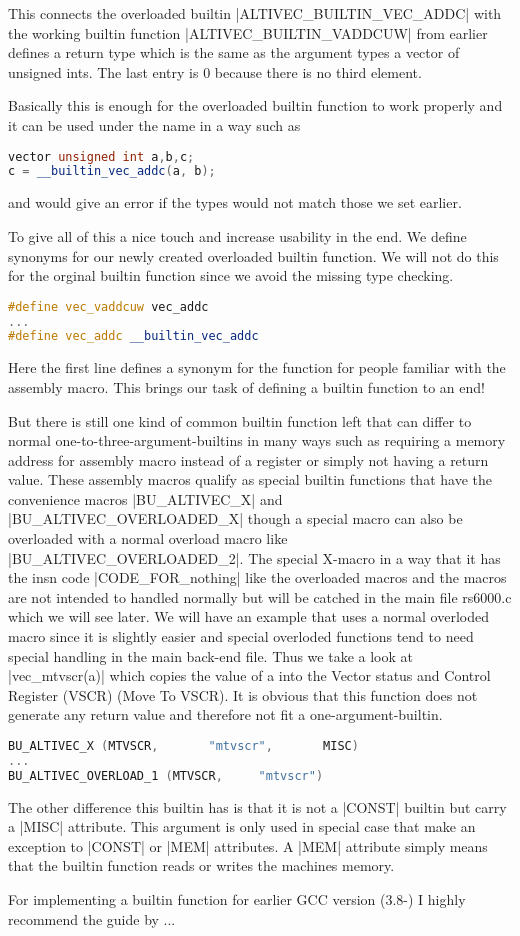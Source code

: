 This connects the overloaded builtin |ALTIVEC_BUILTIN_VEC_ADDC| with the working builtin function |ALTIVEC_BUILTIN_VADDCUW| from earlier defines a return type which is the same as the argument types a vector of unsigned ints. The last entry is 0 because there is no third element.

Basically this is enough for the overloaded builtin function to work properly and it can be used under the name in a way such as
\begin{lstlisting}[language=C++,basicstyle=\ttfamily\scriptsize,keywordstyle=\color{red}] 
vector unsigned int a,b,c;
c = __builtin_vec_addc(a, b);
\end{lstlisting}
and would give an error if the types would not match those we set earlier.

To give all of this a nice touch and increase usability in the end. We define synonyms for our newly created overloaded builtin function. We will not do this for the orginal builtin function since we avoid the missing type checking.
\begin{lstlisting}[language=C++,basicstyle=\ttfamily\scriptsize,keywordstyle=\color{red}] 
#define vec_vaddcuw vec_addc
...
#define vec_addc __builtin_vec_addc
\end{lstlisting}
Here the first line defines a synonym for the function for people familiar with the assembly macro.
This brings our task of defining a builtin function to an end!

But there is still one kind of common builtin function left that can differ to normal one-to-three-argument-builtins in many ways such as requiring a memory address for assembly macro instead of a register or simply not having a return value. These assembly macros qualify as special builtin functions that have the convenience macros |BU_ALTIVEC_X| and |BU_ALTIVEC_OVERLOADED_X| though a special macro can also be overloaded with a normal overload macro like |BU_ALTIVEC_OVERLOADED_2|.
The special X-macro in a way that it has the insn code |CODE_FOR_nothing| like the overloaded macros and the macros are not intended to handled normally but will be catched in the main file rs6000.c which we will see later.
We will have an example that uses a normal overloded macro since it is slightly easier and special overloded functions tend to need special handling in the main back-end file. Thus we take a look at |vec_mtvscr(a)| which copies the value of a into the Vector status and Control Register (VSCR) (Move To VSCR).
It is obvious that this function does not generate any return value and therefore not fit a one-argument-builtin.
\begin{lstlisting}[language=C++,basicstyle=\ttfamily\scriptsize,keywordstyle=\color{red}] 
BU_ALTIVEC_X (MTVSCR,		"mtvscr",	    MISC)
...
BU_ALTIVEC_OVERLOAD_1 (MTVSCR,	   "mtvscr")
\end{lstlisting}
The other difference this builtin has is that it is not a |CONST| builtin but carry a |MISC| attribute. This argument is only used in special case that make an exception to |CONST| or |MEM| attributes. A |MEM| attribute simply means that the builtin function reads or writes the machines memory.

For implementing a builtin function for earlier GCC version (3.8-) I highly recommend the guide by ...

     
